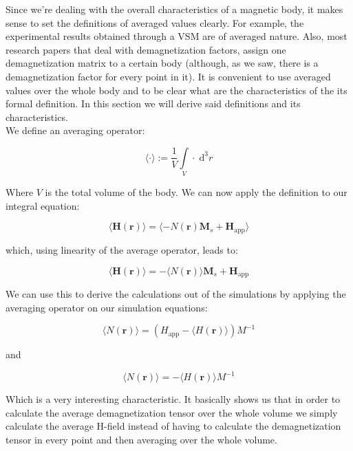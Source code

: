 Since we're dealing with the overall characteristics of a magnetic body, it makes sense to set the definitions of averaged values clearly. For example, the experimental results obtained through a VSM are of averaged nature. Also, most research papers that deal with demagnetization factors, assign one demagnetization matrix to a certain body (although, as we saw, there is a demagnetization factor for every point in it). It is convenient to use averaged values over the whole body and to be clear what are the characteristics of the its formal definition. In this section we will derive said definitions and its characteristics.\\

We define an averaging operator:

\begin{equation}
\langle \cdot \rangle := \frac{1}{V}\int\limits_V \cdot \;\text{d}^3r
\end{equation}

Where $V$ is the total volume of the body. We can now apply the definition to our integral equation:

\begin{equation}
\langle \textbf{H}(\textbf{r})\rangle = \langle-N(\textbf{r})\textbf{M}_s  + \textbf{H}_\text{app} \rangle
\end{equation}

which, using linearity of the average operator, leads to:

\begin{equation}
\langle \textbf{H}(\textbf{r})\rangle = -\langle N(\textbf{r}) \rangle\textbf{M}_s  + \textbf{H}_\text{app}
\end{equation}

We can use this to derive the calculations out of the simulations by applying the averaging operator on our simulation equations:

\begin{equation}
\langle N(\textbf{r}) \rangle = ( H_\text{app}-\langle H(\textbf{r})\rangle )M^{-1} 
\end{equation}

and

\begin{equation}
\langle N(\textbf{r}) \rangle = -\langle H(\textbf{r})\rangle M^{-1} 
\end{equation}

Which is a very interesting characteristic. It basically shows us that in order to calculate the average demagnetization tensor over the whole volume we simply calculate the average H-field instead of having to calculate the demagnetization tensor in every point and then averaging over the whole volume. \\

